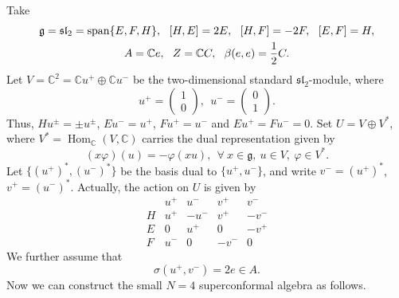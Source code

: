 \documentclass[12pt]{article}
\numberwithin{equation}{section}
\theoremstyle{definition}
\theoremstyle{plain}
\newcommand{\bC}{\ensuremath{\mathbb{C}}}
\newcommand{\Span}{\mathrm{span }}
\newcommand{\fg}{\mathfrak{g}}
\begin{document}
Take
\begin{gather}
    \fg=\mathfrak{sl}_2=\Span\{E,F,H\},\ \ [H,E]=2E,\ \ [H,F]=-2F,\ \ [E,F]=H,\label{sl_2}\\
    A=\bC e,\ \ Z=\bC C,\ \ \beta(e,e)=\frac{1}{2}C. \notag
\end{gather}
Let $V=\mathbb C^2=\mathbb Cu^+\oplus\mathbb Cu^-$ be the two-dimensional standard $\mathfrak{sl}_2$-module, where
\begin{equation*}
    u^+=\begin{pmatrix}1\\0\end{pmatrix},\ \ u^-=\begin{pmatrix}0\\1\end{pmatrix}.
\end{equation*}
Thus, $Hu^\pm=\pm u^\pm$, $Eu^-=u^+$, $Fu^+=u^-$ and $Eu^+=Fu^-=0$.
Set \(U=V\oplus V^*\), where \(V^*=\operatorname{Hom}_{\mathbb C}(V,\mathbb C)\) carries the dual representation given by
\begin{equation*}
    (x\varphi)(u)=-\varphi(xu),\ \ \forall\ x\in\mathfrak g,\ u\in V,\ \varphi\in V^*.
\end{equation*}
Let $\{(u^+)^*,(u^-)^*\}$ be the basis dual to $\{u^+,u^-\}$, and write $v^-=(u^+)^*$, $v^+=(u^-)^*$. Actually, the action on $U$ is given by
\[
\begin{array}{c|cccc}
  & u^+ & u^- & v^+ & v^- \\ \hline
H & u^+ & -u^- & v^+ & -v^- \\
E & 0 & u^+ & 0 & -v^+ \\
F & u^- & 0 & -v^- & 0
\end{array}
\]
We further assume that
\begin{equation}\label{N4.assum.sigma}
    \sigma(u^+,v^-)=2e\in A.
\end{equation}
Now we can construct the small $N=4$ superconformal algebra as follows.
\end{document}
